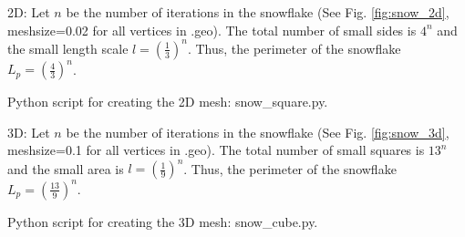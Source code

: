 \documentclass[12pt]{article}%
\theoremstyle{plain}
\numberwithin{equation}{section}
\begin{document}
2D: Let $n$ be the number of iterations in the snowflake (See Fig. \ref{fig:snow_2d}, meshsize=0.02 for all vertices in .geo).  The total number of small sides is $4^n$ and the small length scale $l=\left(\frac{1}{3}\right)^n$. Thus, the perimeter of the snowflake $L_p=\left(\frac{4}{3}\right)^n$. 

Python script for creating the 2D mesh: snow\_square.py. 

3D: Let $n$ be the number of iterations in the snowflake (See Fig. \ref{fig:snow_3d}, meshsize=0.1 for all vertices in .geo). The total number of small squares is $13^n$ and the small area is $l=(\frac{1}{9})^n$. Thus, the perimeter of the snowflake $L_p=\left(\frac{13}{9}\right)^n$. 


Python script for creating the 3D mesh: snow\_cube.py. 
\end{document}

